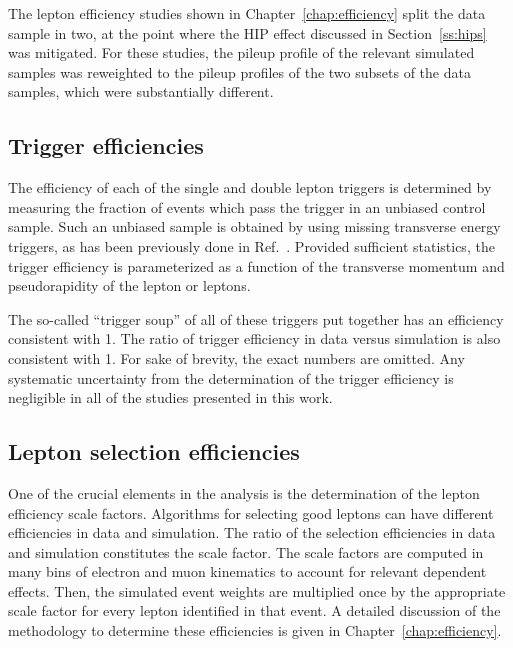 

The lepton efficiency studies shown in Chapter~\ref{chap:efficiency} split the data sample in two,
at the point where the HIP effect discussed in Section~\ref{ss:hips} was mitigated.
For these studies, the pileup profile of the relevant simulated samples was reweighted to
the pileup profiles of the two subsets of the data samples, which were substantially different.

\subsection{Trigger efficiencies}
\label{subsec:trigeff}
The efficiency of each of the single and double lepton triggers is determined 
by measuring the fraction of events which pass the trigger in an unbiased control sample.
Such an unbiased sample is obtained by using missing transverse energy triggers, as
has been previously done in Ref.~\cite{Khachatryan:2015oqa}. 
Provided sufficient statistics, the trigger efficiency is parameterized as a function of the 
transverse momentum and pseudorapidity of the lepton or leptons.

The so-called ``trigger soup'' of all of these triggers put together has an efficiency
consistent with 1.
The ratio of trigger efficiency in data versus simulation is also consistent with 1.
For sake of brevity, the exact numbers are omitted.
Any systematic uncertainty from the determination of the trigger efficiency is negligible in
all of the studies presented in this work.

\subsection{Lepton selection efficiencies}
One of the crucial elements in the analysis is the determination of the lepton efficiency scale factors.
Algorithms for selecting good leptons can have different efficiencies in data and simulation.
The ratio of the selection efficiencies in data and simulation constitutes the scale factor.
The scale factors are computed in many bins of electron and muon kinematics to account for relevant dependent effects.
Then, the simulated event weights are multiplied once by the appropriate scale factor for every
lepton identified in that event. A detailed discussion of the methodology to determine these efficiencies is given in Chapter~\ref{chap:efficiency}.

